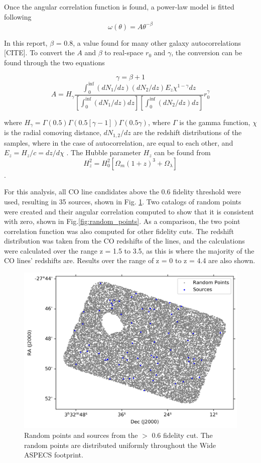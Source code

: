 Once the angular correlation function is found, a power-law model is fitted following $$\omega(\theta) = A\theta^{-\beta} $$

In this report, $\beta$ = 0.8, a value found for many other galaxy autocorrelations [CITE]. To convert the $A$ and $\beta$ to real-space $r_0$ and $\gamma$, the conversion can be found through the two equations

$$ \gamma = \beta + 1 $$ $$ A = H_{\gamma}\frac{\int_{0}^{\inf} (dN_1/dz)(dN_2/dz)E_z\chi^{1 - \gamma} dz}{[\int_{0}^{\inf} (dN_1/dz)dz][\int_{0}^{\inf} (dN_2/dz)dz]}r_0^{\gamma}$$

where $H_{\gamma} = \Gamma(0.5)\Gamma(0.5[\gamma -1])\Gamma(0.5\gamma)$, where $\Gamma$ is the gamma function, $\chi$ is the radial comoving distance, $dN_{1,2}/dz$ are the redshift distributions of the samples, where in the case of autocorrelation, are equal to each other, and $E_z = H_z/c = dz/d\chi$ \cite{hickox2011clustering}. The Hubble parameter $H_z$ can be found from
$$H_z^2 = H_0^2[\Omega_m(1+z)^3 + \Omega_{\lambda}]$$ \cite{hickox2011clustering}.

For this analysis, all CO line candidates above the 0.6 fidelity threshold were used, resulting in 35 sources, shown in Fig. \ref{fig:Clustering_points}. Two catalogs of random points were created and their angular correlation computed to show that it is consistent with zero, shown in Fig.\ref{fig:random_points}. As a comparison, the two point correlation function was also computed for other fidelity cuts. The redshift distribution was taken from the CO redshifts of the lines, and the calculations were calculated over the range z = 1.5 to 3.5, as this is where the majority of the CO lines' redshifts are. Results over the range of z = 0 to z = 4.4 are also shown. 

\begin{figure}[tbp]
\centering \includegraphics[width=120mm]{PDFS/NX_V_Y_Sources_20000.png}
\caption{Random points and sources from the $>$ 0.6 fidelity cut. The random points are distributed uniformly throughout the Wide ASPECS footprint.}
\label{fig:Clustering_points}
\end{figure}

